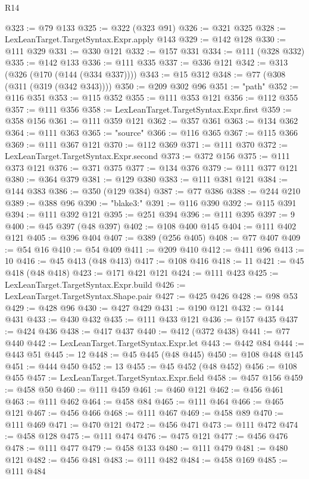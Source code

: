 \begin{lexlean}{R14}
\begin{coremodule}
@323 := @79 @133
@325 := @322 (@323 @91)
@326 := @321 @325
@328 := LexLeanTarget.TargetSyntax.Expr.apply @143
@329 := @142 @128
@330 := @111 @329
@331 := @330 @121
@332 := @157 @331
@334 := @111 (@328 @332)
@335 := @142 @133
@336 := @111 @335
@337 := @336 @121
@342 := @313 (@326 (@170 (@144 (@334 @337))))
@343 := @15 @312
@348 := @77 (@308 (@311 (@319 (@342 @343))))
@350 := @209 @302 @96
@351 := "path"
@352 := @116 @351
@353 := @115 @352
@355 := @111 @353 @121
@356 := @112 @355
@357 := @111 @356
@358 := LexLeanTarget.TargetSyntax.Expr.first
@359 := @358 @156
@361 := @111 @359 @121
@362 := @357 @361
@363 := @134 @362
@364 := @111 @363
@365 := "source"
@366 := @116 @365
@367 := @115 @366
@369 := @111 @367 @121
@370 := @112 @369
@371 := @111 @370
@372 := LexLeanTarget.TargetSyntax.Expr.second
@373 := @372 @156
@375 := @111 @373 @121
@376 := @371 @375
@377 := @134 @376
@379 := @111 @377 @121
@380 := @364 @379
@381 := @129 @380
@383 := @111 @381 @121
@384 := @144 @383
@386 := @350 (@129 @384)
@387 := @77 @386
@388 := @244 @210
@389 := @388 @96
@390 := "blake3:"
@391 := @116 @390
@392 := @115 @391
@394 := @111 @392 @121
@395 := @251 @394
@396 := @111 @395
@397 := 9
@400 := @45 @397 (@48 @397)
@402 := @108 @400 @145
@404 := @111 @402 @121
@405 := @396 @404
@407 := @389 (@256 @405)
@408 := @77 @407
@409 := @54 @16
@410 := @54 @409
@411 := @209 @410
@412 := @411 @96
@413 := 10
@416 := @45 @413 (@48 @413)
@417 := @108 @416
@418 := 11
@421 := @45 @418 (@48 @418)
@423 := @171 @421 @121
@424 := @111 @423
@425 := LexLeanTarget.TargetSyntax.Expr.build
@426 := LexLeanTarget.TargetSyntax.Shape.pair
@427 := @425 @426
@428 := @98 @53
@429 := @428 @96
@430 := @427 @429
@431 := @190 @121
@432 := @144 @431
@433 := @430 @432
@435 := @111 @433 @121
@436 := @157 @435
@437 := @424 @436
@438 := @417 @437
@440 := @412 (@372 @438)
@441 := @77 @440
@442 := LexLeanTarget.TargetSyntax.Expr.let
@443 := @442 @84
@444 := @443 @51
@445 := 12
@448 := @45 @445 (@48 @445)
@450 := @108 @448 @145
@451 := @444 @450
@452 := 13
@455 := @45 @452 (@48 @452)
@456 := @108 @455
@457 := LexLeanTarget.TargetSyntax.Expr.field
@458 := @457 @156
@459 := @458 @50
@460 := @111 @459
@461 := @460 @121
@462 := @456 @461
@463 := @111 @462
@464 := @458 @84
@465 := @111 @464
@466 := @465 @121
@467 := @456 @466
@468 := @111 @467
@469 := @458 @89
@470 := @111 @469
@471 := @470 @121
@472 := @456 @471
@473 := @111 @472
@474 := @458 @128
@475 := @111 @474
@476 := @475 @121
@477 := @456 @476
@478 := @111 @477
@479 := @458 @133
@480 := @111 @479
@481 := @480 @121
@482 := @456 @481
@483 := @111 @482
@484 := @458 @169
@485 := @111 @484

\end{coremodule}
\end{lexlean}
